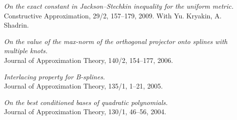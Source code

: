\documentclass[11pt]{article}
\begin{document}
\item {\sl On the exact constant in Jackson--Stechkin inequality for the uniform metric.}\\
Constructive Approximation, 29/2, 157--179, 2009. 
With Yu. Kryakin, A. Shadrin.
\item {\sl On the value of the max-norm of the orthogonal projector onto splines with multiple knots.}\\
Journal of Approximation Theory, 140/2, 154--177, 2006.
\item {\sl  Interlacing property for B-splines.}\\
Journal of Approximation Theory, 135/1, 1--21, 2005.
\item {\sl On the best conditioned bases of quadratic polynomials.}\\
Journal of Approximation Theory, 130/1, 46--56, 2004.
\eetaremune
	
\end{document}
